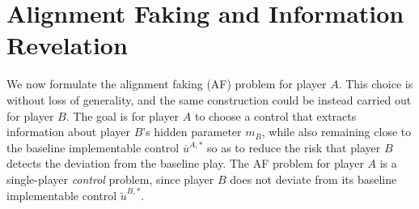 \documentclass[letterpaper, 10 pt, conference]{ieeeconf}
\newcommand{\E}{\mathbb E}
\newcommand{\Var}{\mathrm{Var}}
\newtheorem{remark}{Remark}
\begin{document}


\section{Alignment Faking  and Information Revelation}\label{sec:AF}
We now formulate the alignment faking (AF) problem for player $A$. This choice is without loss of generality, and the same construction could be instead carried out for player $B$. The goal is for player $A$ to choose a control that extracts information about player $B$'s hidden parameter $m_B$, while also remaining close to the baseline implementable control $\overline{u}^{A,*}$ so as to reduce the risk that player $B$ detects the deviation from the baseline play.  The AF problem for player $A$ is a single-player \emph{control} problem, since player $B$ does not deviate from its baseline implementable control $\widetilde{u}^{B,\ast}$.
\end{document}
